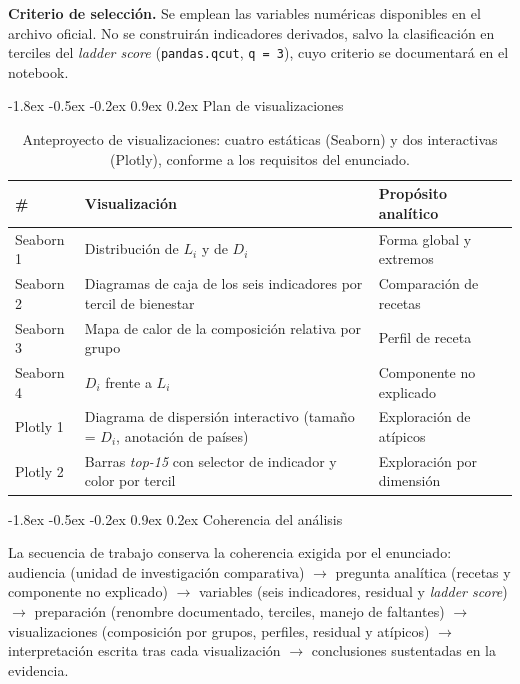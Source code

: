 \documentclass[11pt,a4paper]{article}
\makeatletter
\renewcommand\section{\@startsection{section}{1}{\z@}%
  {-1.8ex \@plus -0.5ex \@minus -0.2ex}%
  {0.9ex \@plus0.2ex}%
  {\normalfont\large\bfseries}}
\makeatother
\begin{document}
\textbf{Criterio de selección.} Se emplean las variables numéricas disponibles en
el archivo oficial. No se construirán indicadores derivados, salvo la
clasificación en terciles del \emph{ladder score} (\texttt{pandas.qcut},
\texttt{q = 3}), cuyo criterio se documentará en el notebook.

\section{Plan de visualizaciones}

\begin{table}[htbp]
\centering
\caption{Anteproyecto de visualizaciones: cuatro estáticas (Seaborn) y dos
interactivas (Plotly), conforme a los requisitos del enunciado.}
\label{tab:plan}
\small
\begin{tabular}{>{\raggedright\arraybackslash}p{2.0cm}
                >{\raggedright\arraybackslash}p{7.5cm}
                >{\raggedright\arraybackslash}p{5.2cm}}
\toprule
\textbf{\#} & \textbf{Visualización} & \textbf{Propósito analítico} \\
\midrule
Seaborn 1 & Distribución de $L_i$ y de $D_i$ & Forma global y extremos \\
Seaborn 2 & Diagramas de caja de los seis indicadores por tercil de bienestar & Comparación de recetas \\
Seaborn 3 & Mapa de calor de la composición relativa por grupo & Perfil de receta \\
Seaborn 4 & $D_i$ frente a $L_i$ & Componente no explicado \\
Plotly 1 & Diagrama de dispersión interactivo (tamaño = $D_i$, anotación de países) & Exploración de atípicos \\
Plotly 2 & Barras \emph{top-15} con selector de indicador y color por tercil & Exploración por dimensión \\
\bottomrule
\end{tabular}
\end{table}

\section{Coherencia del análisis}

La secuencia de trabajo conserva la coherencia exigida por el enunciado:
audiencia (unidad de investigación comparativa) $\rightarrow$ pregunta analítica
(recetas y componente no explicado) $\rightarrow$ variables (seis indicadores,
residual y \emph{ladder score}) $\rightarrow$ preparación (renombre documentado,
terciles, manejo de faltantes) $\rightarrow$ visualizaciones (composición por
grupos, perfiles, residual y atípicos) $\rightarrow$ interpretación escrita tras
cada visualización $\rightarrow$ conclusiones sustentadas en la evidencia.
\end{document}
